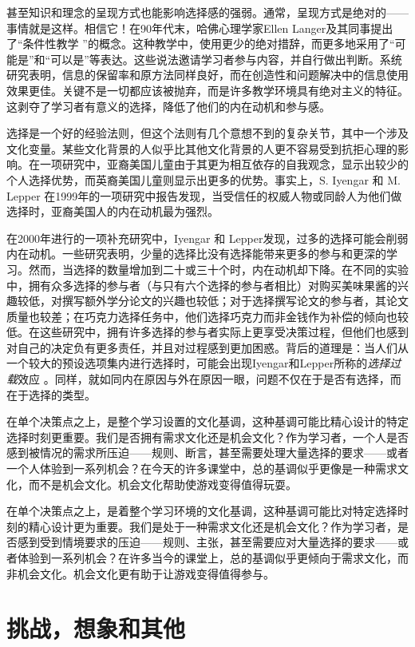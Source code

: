 甚至知识和理念的呈现方式也能影响选择感的强弱。通常，呈现方式是绝对的——事情就是这样。相信它！在90年代末，哈佛心理学家Ellen Langer及其同事提出了“条件性教学 ”的概念。这种教学中，使用更少的绝对措辞，而更多地采用了“可能是”和“可以是”等表达。这些说法邀请学习者参与内容，并自行做出判断。系统研究表明，信息的保留率和原方法同样良好，而在创造性和问题解决中的信息使用效果更佳。关键不是一切都应该被抛弃，而是许多教学环境具有绝对主义的特征。这剥夺了学习者有意义的选择，降低了他们的内在动机和参与感。

选择是一个好的经验法则，但这个法则有几个意想不到的复杂关节，其中一个涉及文化变量。某些文化背景的人似乎比其他文化背景的人更不容易受到抗拒心理的影响。在一项研究中，亚裔美国儿童由于其更为相互依存的自我观念，显示出较少的个人选择优势，而英裔美国儿童则显示出更多的优势。事实上，S. Iyengar 和 M. Lepper 在1999年的一项研究中报告发现，当受信任的权威人物或同龄人为他们做选择时，亚裔美国人的内在动机最为强烈。

在2000年进行的一项补充研究中，Iyengar 和 Lepper发现，过多的选择可能会削弱内在动机。一些研究表明，少量的选择比没有选择能带来更多的参与和更深的学习。然而，当选择的数量增加到二十或三十个时，内在动机却下降。在不同的实验中，拥有众多选择的参与者（与只有六个选择的参与者相比）对购买美味果酱的兴趣较低，对撰写额外学分论文的兴趣也较低；对于选择撰写论文的参与者，其论文质量也较差；在巧克力选择任务中，他们选择巧克力而非金钱作为补偿的倾向也较低。在这些研究中，拥有许多选择的参与者实际上更享受决策过程，但他们也感到对自己的决定负有更多责任，并且对过程感到更加困惑。背后的道理是：当人们从一个较大的预设选项集内进行选择时，可能会出现Iyengar和Lepper所称的\textit{选择过载}效应 。同样，就如同内在原因与外在原因一眼，问题不仅在于是否有选择，而在于选择的类型。

在单个决策点之上，是整个学习设置的文化基调，这种基调可能比精心设计的特定选择时刻更重要。我们是否拥有需求文化还是机会文化？作为学习者，一个人是否感到被情况的需求所压迫——规则、断言，甚至需要处理大量选择的要求——或者一个人体验到一系列机会？在今天的许多课堂中，总的基调似乎更像是一种需求文化，而不是机会文化。机会文化帮助使游戏变得值得玩耍。

在单个决策点之上，是着整个学习环境的文化基调，这种基调可能比对特定选择时刻的精心设计更为重要。我们是处于一种需求文化还是机会文化？作为学习者，是否感到受到情境要求的压迫——规则、主张，甚至需要应对大量选择的要求——或者体验到一系列机会？在许多当今的课堂上，总的基调似乎更倾向于需求文化，而非机会文化。机会文化更有助于让游戏变得值得参与。

\section*{挑战，想象和其他}

